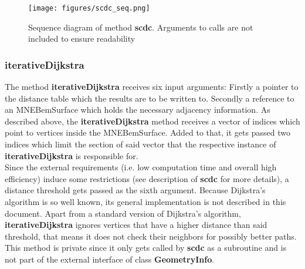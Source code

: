 \clearpage

\begin{figure}[h]
	\begin{center}
		\texttt{[image: figures/scdc\_seq.png]}
		\caption{Sequence diagram of method \textbf{scdc}. Arguments to calls are not included to ensure readability}
	\end{center}
\end{figure}

\subsubsection{iterativeDijkstra}
The method \textbf{iterativeDijkstra} receives six input arguments: Firstly a pointer to the distance table which the results are to be written to. Secondly a reference to an MNEBemSurface which holds the necessary adjacency information. As described above, the \textbf{iterativeDijkstra} method receives a vector of indices which point to vertices inside the MNEBemSurface. Added to that, it gets passed two indices which limit the section of said vector that the respective instance of \textbf{iterativeDijkstra} is responsible for.\\
Since the external requirements (i.e. low computation time and overall high efficiency) induce some restrictions (see description of \textbf{scdc} for more details), a distance threshold gets passed as the sixth argument. Because Dijkstra's algorithm is so well known, its general implementation is not described in this document. Apart from a standard version of Dijkstra's algorithm, \textbf{iterativeDijkstra} ignores vertices that have a higher distance than said threshold, that means it does not check their neighbors for possibly better paths.\\
This method is private since it only gets called by \textbf{scdc} as a subroutine and is not part of the external interface of class \textbf{GeometryInfo}.

